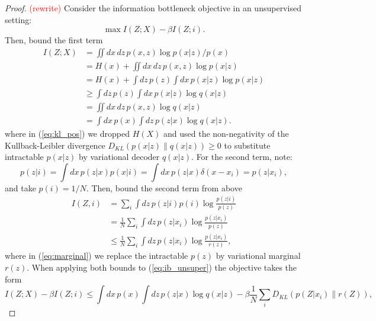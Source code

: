 \documentclass[11pt]{article}
\newcommand\myworries[1]{\textcolor{red}{(#1)}}
\begin{document}
\begin{proof}
\myworries{rewrite}
Consider the information bottleneck objective in an unsupervised setting:
\begin{equation}
\max I(Z;X) - \beta I(Z;i).
\label{eq:ib_unsuper}
\end{equation}
Then, bound the first term
\begin{align}
I(Z;X) 
&= \iint dx\,dz\,p(x,z) \log p(x|z)/p(x) \\
&= H(x) + \iint dx\,dz\,p(x,z) \log p(x|z)  \\
&= H(x) + \int dz\,p(z) \int dx\,p(x|z) \log p(x|z)  \\
&\geq \int dz\,p(z) \int dx\,p(x|z) \log q(x|z) \label{eq:kl_pos} \\
&= \iint dx\,dz\,p(x,z) \log q(x|z)  \\
&= \int dx\,p(x) \int dz\,p(z|x) \log q(x|z).
\end{align}
where in (\ref{eq:kl_pos}) we dropped $H(X)$ and used the non-negativity of the Kullback-Leibler divergence $D_{KL}(p(x\vert z)\rVert q(x\vert z)) \geq 0$ to substitute intractable $p(x\vert z)$ by variational decoder $q(x\vert z)$.
For the second term, note:
\begin{equation}
p(z\vert i) = \int dx\,p(z\vert x)p(x\vert i) = \int dx\,p(z\vert x)\delta(x-x_i) = p(z\vert x_i),
\end{equation}
and take $p(i) = 1/N.$
Then, bound the second term from above
\begin{align}
I(Z,i)
&= \sum_i\int dz\,p(z\vert i)p(i)\log\frac{p(z\vert i)}{p(z)}\\
&= \frac{1}{N} \sum_i\int dz\, p(z\vert x_i)\log\frac{p(z\vert x_i)}{p(z)}\\
&\leq \frac{1}{N} \sum_i\int dz\, p(z\vert x_i) \log\frac{p(z\vert x_i)}{r(z)}\label{eq:marginal},
\end{align}
where in (\ref{eq:marginal}) we replace the intractable $p(z)$ by variational marginal $r(z)$.
When applying both bounds to (\ref{eq:ib_unsuper}) the objective takes the form
\begin{equation}
I(Z;X) - \beta I(Z;i) \leq \int dx\,p(x)\int dz\, p(z\vert x) \log q(x\vert z) - \beta \frac{1}{N} \sum_i D_{KL}(p(Z\vert x_i)\rVert r(Z)),
\end{equation}
\end{proof}
\end{document}
